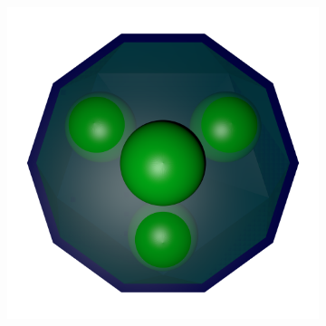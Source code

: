 \begin{figure} %
	\centering
	\begin{subfigure}[b]{0.49\textwidth}
		\includegraphics[width=\textwidth]{images/scene.png}
				

\end{subfigure}
\end{figure}
